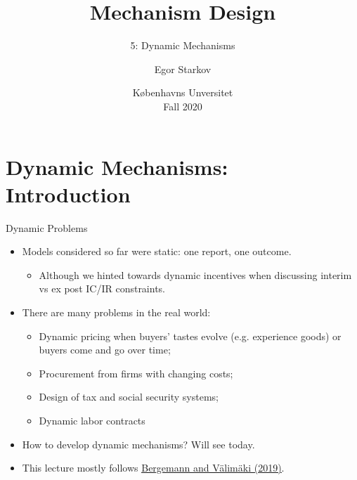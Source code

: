 \documentclass[english,10pt
,aspectratio=169
]{beamer}
\title{Mechanism Design}
\subtitle{5: Dynamic Mechanisms}
\author{Egor Starkov}
\date{K{\o}benhavns Unversitet \\
	Fall 2020}
\begin{document}
	\frame[plain]{\titlepage}


\section{Dynamic Mechanisms: Introduction}

\begin{frame}{Dynamic Problems}
\begin{itemize}
	\item Models considered so far were static: one report, one outcome.
	\begin{itemize}
		\item Although we hinted towards dynamic incentives when discussing interim vs ex post IC/IR constraints.
	\end{itemize}
	\item There are many  problems in the real world:
	\begin{itemize}
		\item Dynamic pricing when buyers' tastes evolve (e.g. experience goods) or buyers come and go over time;
		\item Procurement from firms with changing costs;
		\item Design of tax and social security systems;
		\item Dynamic labor contracts
	\end{itemize}
	\item How to develop dynamic mechanisms? Will see today.
	\item This lecture mostly follows \href{https://www.aeaweb.org/articles?id=10.1257/jel.20180892}{\uline{Bergemann and V{\"a}lim{\"a}ki (2019)}}.
\end{itemize}
\end{frame}
\end{document}
